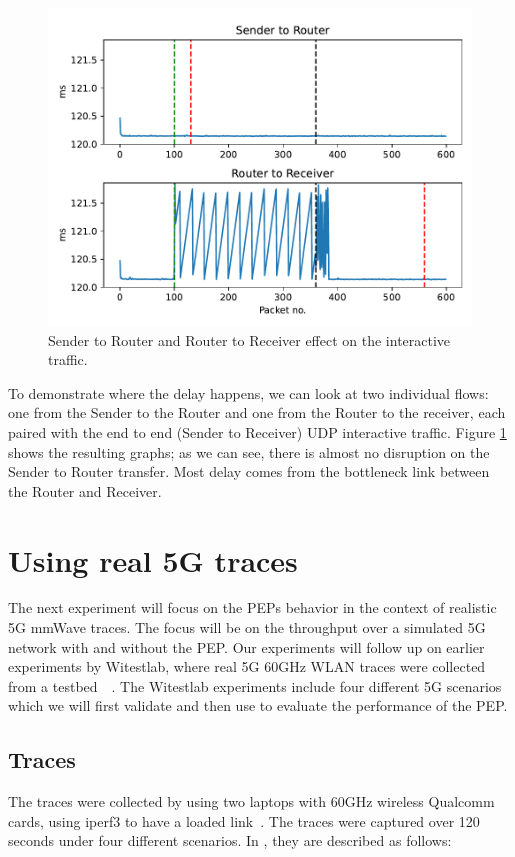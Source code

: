 \documentclass[a4paper,english, 12pt]{report}
\begin{document}
\clearpage
\begin{figure}[h!] %
	\centering
	\includegraphics[scale=0.60]{../diagrams/graphs/compare.pdf}
  	\caption{Sender to Router and Router to Receiver effect on the interactive traffic.}
  	\label{fig:graph3}
\end{figure}

To demonstrate where the delay happens, we can look at two individual flows: one from the Sender to the Router and one from the Router to the receiver, each paired with the end to end (Sender to Receiver) UDP interactive traffic. Figure \ref{fig:graph3} shows the resulting graphs; as we can see, there is almost no disruption on the Sender to Router transfer. Most delay comes from the bottleneck link between the Router and Receiver.

\section{Using real 5G traces}

The next experiment will focus on the PEPs behavior in the context of realistic 5G mmWave traces. The focus will be on the throughput over a simulated 5G network with and without the PEP. Our experiments will follow up on earlier experiments by Witestlab, where real 5G 60GHz WLAN traces were collected from a testbed~\cite{Srivastava_Fund_Panwar_2020}~\cite{hingane2020aqm}. The Witestlab experiments include four different 5G scenarios which we will first validate and then use to evaluate the performance of the PEP.

\subsection{Traces}
The traces were collected by using two laptops with 60GHz wireless Qualcomm cards, using iperf3 to have a loaded link~\cite{Srivastava_Fund_Panwar_2020}. The traces were captured over 120 seconds under four different scenarios. In \cite{Srivastava_Fund_Panwar_2020}, they are described as follows:
\end{document}
